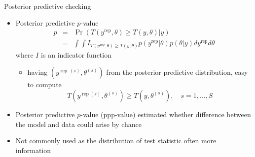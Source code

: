 \documentclass[t]{beamer}
\DeclareMathOperator{\rep}{\mathrm{rep}}
\begin{document}
\begin{frame}[fragile]

  {\Large\color{navyblue} Posterior predictive checking}

  \begin{itemize}
  \item<1-> Posterior predictive $p$-value
    \begin{eqnarray*}
      p & = & \Pr(T(y^{\rep},\theta)\geq T(y,\theta)|y)\\
      & = & \int\int
      I_{T(y^{\rep},\theta)\geq T(y,\theta)}p(y^{\rep}|\theta)p(\theta|y)dy^{\rep}d\theta
    \end{eqnarray*}
    where $I$ is an indicator function
    \begin{itemize}
    \item<2-> having $(y^{\rep\,(s)},\theta^{(s)})$ from the posterior predictive
      distribution, easy to compute
      \begin{equation*}
        T(y^{\rep (s)},\theta^{(s)})\geq T(y,\theta^{(s)}), \quad s=1,\ldots,S
      \end{equation*}
    \end{itemize}
    \vspace{-1.5\baselineskip}
  \item<3-> Posterior predictive $p$-value (ppp-value) estimated whether
    difference between the model and data could arise by chance
  \item<4-> Not commonly used as the distribution of test statistic
    often more information
  \end{itemize}

\end{frame}



\end{document}
